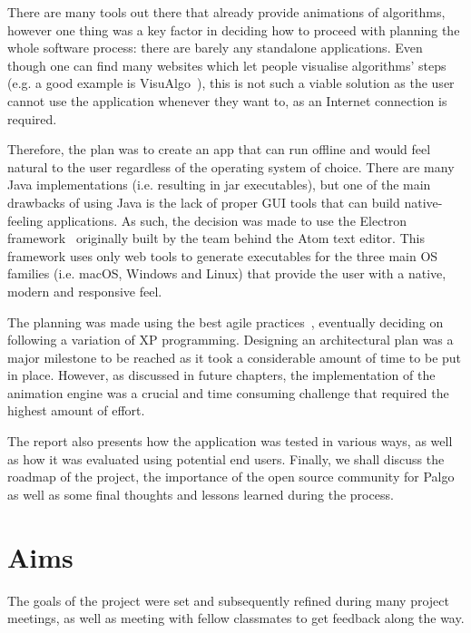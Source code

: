 \documentclass{l4proj}
\begin{document}
There are many tools out there that already provide animations of algorithms, however one thing was a key factor in deciding
how to proceed with planning the whole software process: there are barely any standalone applications. Even though one
can find many websites which let people visualise algorithms' steps (e.g. a good example is VisuAlgo~\cite{visualgo}), this is not such a viable solution as the user cannot use the application whenever they want to, as an Internet connection is required.

Therefore, the plan was to create an app that can run offline and would feel natural to the user regardless of the operating system of choice. There are many Java implementations (i.e. resulting in jar executables), but one of the main drawbacks of using Java is the lack of proper GUI tools that can build native-feeling applications. As such, the decision was made to use the Electron framework~\cite{electron} originally built by the team behind the Atom text editor.
This framework uses only web tools to generate executables for the three main OS families (i.e. macOS, Windows and Linux) that provide the user with a native, modern and responsive feel.

The planning was made using the best agile practices~\cite{agile-methodologies}, eventually deciding on following a variation of XP programming. Designing an architectural plan was a major milestone to be reached as it took a considerable amount of time to be put in place. However, as discussed in future chapters, the implementation of the animation engine was a crucial and time consuming challenge that required the highest amount of effort.

The report also presents how the application was tested in various ways, as well as how it was evaluated using potential
end users. Finally, we shall discuss the roadmap of the project, the importance of the open source community
for Palgo as well as some final thoughts and lessons learned during the process.

\section{Aims}

The goals of the project were set and subsequently refined during many project meetings, as well as meeting with fellow classmates to get feedback along the way.
\end{document}
